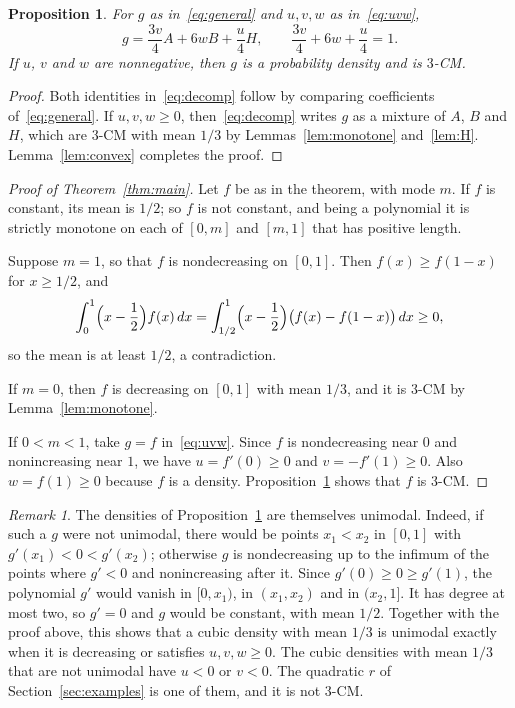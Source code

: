 \documentclass[11pt]{amsart}
\newtheorem{proposition}[theorem]{Proposition}
\theoremstyle{remark}
\newtheorem{remark}[theorem]{Remark}
\numberwithin{equation}{section}
\begin{document}
\begin{proposition}\label{prop:decomp}
For $g$ as in~\eqref{eq:general} and $u,v,w$ as in~\eqref{eq:uvw},
\begin{equation}\label{eq:decomp}
g=\frac{3v}4A+6wB+\frac u4H,\qquad\frac{3v}4+6w+\frac u4=1.
\end{equation}
If $u$, $v$ and $w$ are nonnegative, then $g$ is a probability density and
is $3$-CM.
\end{proposition}

\begin{proof}
Both identities in~\eqref{eq:decomp} follow by comparing coefficients
of~\eqref{eq:general}. If $u,v,w\ge0$, then~\eqref{eq:decomp} writes $g$ as
a mixture of $A$, $B$ and $H$, which are $3$-CM with mean
$1/3$ by Lemmas~\ref{lem:monotone} and~\ref{lem:H}. Lemma~\ref{lem:convex}
completes the proof.
\end{proof}

\begin{proof}[Proof of Theorem~\ref{thm:main}]
Let $f$ be as in the theorem, with mode $m$. If $f$ is constant, its mean
is $1/2$; so $f$ is not constant, and being a polynomial it is strictly
monotone on each of $[0,m]$ and $[m,1]$ that has positive length.

Suppose $m=1$, so that $f$ is nondecreasing on $[0,1]$. Then $f(x)\ge
f(1-x)$ for $x\ge1/2$, and
\[
\int_0^1\Bigl(x-\frac12\Bigr)f(x)\,dx
=\int_{1/2}^1\Bigl(x-\frac12\Bigr)\bigl(f(x)-f(1-x)\bigr)\,dx\ge0,
\]
so the mean is at least $1/2$, a contradiction.

If $m=0$, then $f$ is decreasing on $[0,1]$ with mean $1/3$, and it is
$3$-CM by Lemma~\ref{lem:monotone}.

If $0<m<1$, take $g=f$ in~\eqref{eq:uvw}. Since $f$ is nondecreasing near
$0$ and nonincreasing near $1$, we have $u=f'(0)\ge0$ and $v=-f'(1)\ge0$.
Also $w=f(1)\ge0$ because $f$ is a density. Proposition~\ref{prop:decomp}
shows that $f$ is $3$-CM.
\end{proof}

\begin{remark}
The densities of Proposition~\ref{prop:decomp} are themselves unimodal.
Indeed, if such a $g$ were not unimodal, there would be points $x_1<x_2$ in
$[0,1]$ with $g'(x_1)<0<g'(x_2)$; otherwise $g$ is nondecreasing up to the
infimum of the points where $g'<0$ and nonincreasing after it. Since
$g'(0)\ge0\ge g'(1)$, the polynomial $g'$ would vanish in $[0,x_1)$, in
$(x_1,x_2)$ and in $(x_2,1]$. It has degree at most two, so $g'=0$ and $g$ would
be constant, with mean $1/2$. Together with the proof above, this
shows that a cubic density with mean $1/3$ is unimodal exactly when it is
decreasing or satisfies $u,v,w\ge0$. The cubic densities with mean $1/3$
that are not unimodal have $u<0$ or $v<0$. The quadratic $r$ of
Section~\ref{sec:examples} is one of them, and it is not $3$-CM.
\end{remark}
\end{document}
